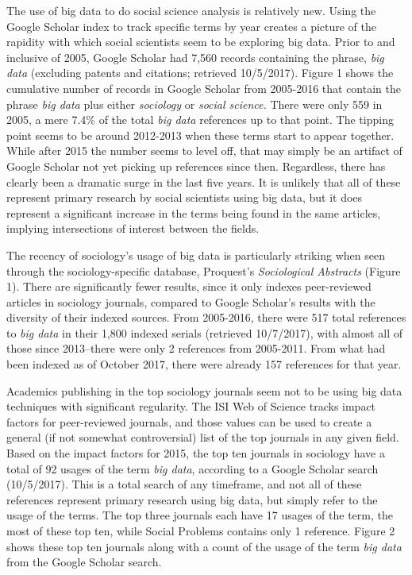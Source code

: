 \documentclass[sigconf]{acmart}
\begin{document}
The use of big data to do social science analysis is relatively new.  Using the Google Scholar index to track specific terms by year creates a picture of the rapidity with which social scientists seem to be exploring big data.  Prior to and inclusive of 2005, Google Scholar had 7,560 records containing the phrase, {\em big data} (excluding patents and citations; retrieved 10/5/2017).  Figure 1 shows the cumulative number of records in Google Scholar from 2005-2016 that contain the phrase {\em big data} plus either {\em sociology} or {\em social science.}  There were only 559 in 2005, a mere 7.4\% of the total {\em big data} references up to that point.  The tipping point seems to be around 2012-2013 when these terms start to appear together.  While after 2015 the number seems to level off, that may simply be an artifact of Google Scholar not yet picking up references since then.  Regardless, there has clearly been a dramatic surge in the last five years.  It is unlikely that all of these represent primary research by social scientists using big data, but it does represent a significant increase in the terms being found in the same articles, implying intersections of interest between the fields.    

The recency of sociology's usage of big data is particularly striking when seen through the sociology-specific database, Proquest's {\em Sociological Abstracts} (Figure 1). There are significantly fewer results, since it only indexes peer-reviewed articles in sociology journals, compared to Google Scholar's results with the diversity of their indexed sources.  From 2005-2016, there were 517 total references to {\em big data} in their 1,800 indexed serials (retrieved 10/7/2017), with almost all of those since 2013--there were only 2 references from 2005-2011.  From what had been indexed as of October 2017, there were already 157 references for that year.    

Academics publishing in the top sociology journals seem not to be using big data techniques with significant regularity.  The ISI Web of Science tracks impact factors for peer-reviewed journals, and those values can be used to create a general (if not somewhat controversial) list of the top journals in any given field.  Based on the impact factors for 2015, the top ten journals in sociology have a total of 92 usages of the term {\em big data}, according to a Google Scholar search (10/5/2017).  This is a total search of any timeframe, and not all of these references represent primary research using big data, but simply refer to the usage of the terms.   The top three journals each have 17 usages of the term, the most of these top ten, while Social Problems contains only 1 reference.  Figure 2 shows these top ten journals along with a count of the usage of the term {\em big data} from the Google Scholar search.  
\end{document}
